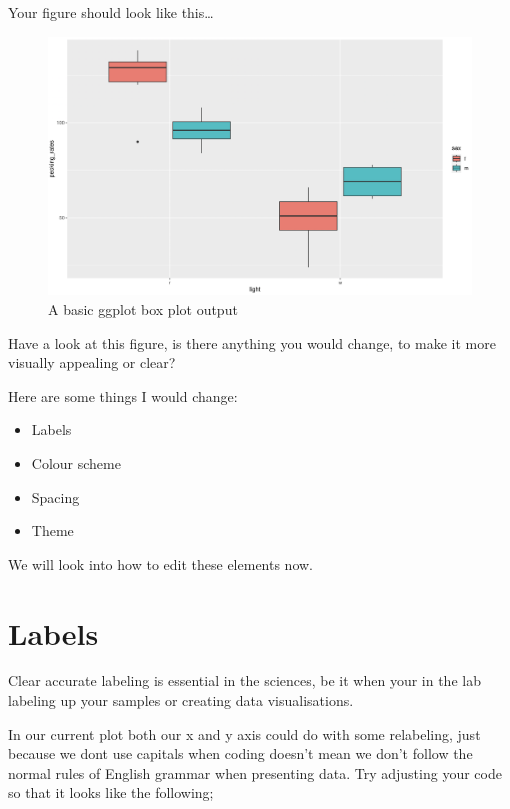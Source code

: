\documentclass[
]{book}
\providecommand{\tightlist}{%
  \setlength{\itemsep}{0pt}\setlength{\parskip}{0pt}}
\begin{document}
Your figure should look like this\ldots{}

\begin{figure}
\includegraphics[width=0.9\linewidth]{figures/pecking_rates_2} \caption{A basic ggplot box plot output}\label{fig:unnamed-chunk-82}
\end{figure}

Have a look at this figure, is there anything you would change, to make it more visually appealing or clear?

Here are some things I would change:

\begin{itemize}
\tightlist
\item
  Labels
\item
  Colour scheme
\item
  Spacing
\item
  Theme
\end{itemize}

We will look into how to edit these elements now.

\hypertarget{labels}{%
\section{Labels}\label{labels}}

Clear accurate labeling is essential in the sciences, be it when your in the lab labeling up your samples or creating data visualisations.

In our current plot both our x and y axis could do with some relabeling, just because we dont use capitals when coding doesn't mean we don't follow the normal rules of English grammar when presenting data. Try adjusting your code so that it looks like the following;
\end{document}
